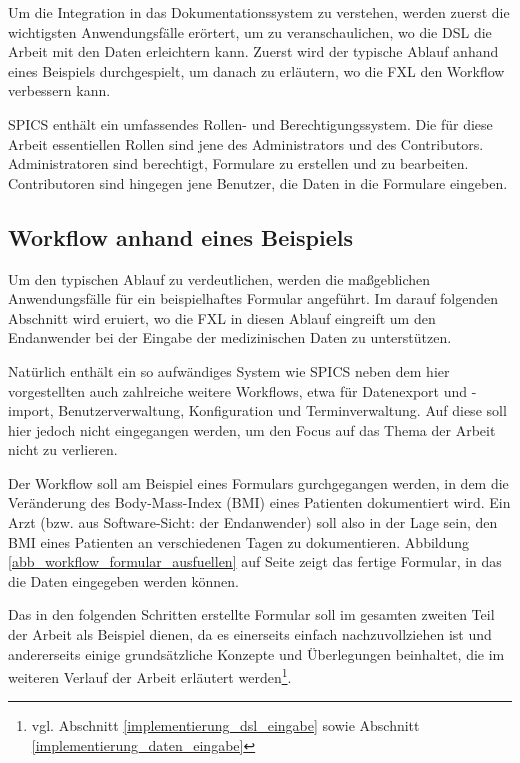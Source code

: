 Um die Integration in das Dokumentationssystem zu verstehen, werden zuerst die wichtigsten Anwendungsfälle erörtert, um zu veranschaulichen, wo die DSL die Arbeit mit den Daten erleichtern kann. Zuerst wird der typische Ablauf anhand eines Beispiels durchgespielt, um danach zu erläutern, wo die FXL den Workflow verbessern kann.

SPICS enthält ein umfassendes Rollen- und Berechtigungssystem. Die für diese Arbeit essentiellen Rollen sind jene des Administrators und des Contributors. Administratoren sind berechtigt, Formulare zu erstellen und zu bearbeiten. Contributoren sind hingegen jene Benutzer, die Daten in die Formulare eingeben.

\subsection{Workflow anhand eines Beispiels}
\label{subsection_workflow_beispiel}


Um den typischen Ablauf zu verdeutlichen, werden die maßgeblichen Anwendungsfälle für ein beispielhaftes Formular angeführt. Im darauf folgenden Abschnitt wird eruiert, wo die FXL in diesen Ablauf eingreift um den Endanwender bei der Eingabe der medizinischen Daten zu unterstützen.

Natürlich enthält ein so aufwändiges System wie SPICS neben dem hier vorgestellten auch zahlreiche weitere Workflows, etwa für Datenexport und -import, Benutzerverwaltung, Konfiguration und Terminverwaltung. Auf diese soll hier jedoch nicht eingegangen werden, um den Focus auf das Thema der Arbeit nicht zu verlieren.

Der Workflow soll am Beispiel eines Formulars gurchgegangen werden, in dem die Veränderung des Body-Mass-Index (BMI) eines Patienten dokumentiert wird. Ein Arzt (bzw. aus Software-Sicht: der Endanwender) soll also in der Lage sein, den BMI eines Patienten an verschiedenen Tagen zu dokumentieren. Abbildung \ref{abb_workflow_formular_ausfuellen} auf Seite \pageref{abb_workflow_formular_ausfuellen} zeigt das fertige Formular, in das die Daten eingegeben werden können.

Das in den folgenden Schritten erstellte Formular soll im gesamten zweiten Teil der Arbeit als Beispiel dienen, da es einerseits einfach nachzuvollziehen ist und andererseits einige grund\-sätz\-liche Konzepte und Überlegungen beinhaltet, die im weiteren Verlauf der Arbeit erläutert werden\footnote{vgl. Abschnitt \ref{implementierung_dsl_eingabe}   sowie Abschnitt \ref{implementierung_daten_eingabe} }.

